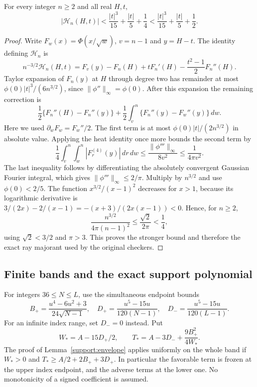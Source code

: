 \begin{lemma}
\label{ext:global-gaussian-ray}
For every integer $n\ge2$ and all real $H,t$,
\[
 |\mathcal H_n(H,t)|
 <\frac{|t|^3}{15}+\frac{|t|}{5}+\frac14
 <\frac{|t|^3}{15}+\frac{|t|}{5}+\frac12.
\]
\end{lemma}
\begin{proof}
Write $F_w(x)=\Phi(x/\sqrt w)$, $v=n-1$ and $y=H-t$.
The identity defining $\mathcal H_n$ is
\[
 n^{-3/2}\mathcal H_n(H,t)
 =F_v(y)-F_n(H)+tF_n'(H)-\frac{t^2-1}{2}F_n''(H).
\]
Taylor expansion of $F_n(y)$ at $H$ through degree two has remainder
at most $\phi(0)|t|^3/(6n^{3/2})$, since
$\|\phi''\|_\infty=\phi(0)$.
After this expansion the remaining correction is
\[
 \frac12\{F_n''(H)-F_n''(y)\}
 +\frac12\int_v^n\{F_n''(y)-F_w''(y)\}\,dw.
\]
Here we used $\partial_wF_w=F_w''/2$. The first term is at most
$\phi(0)|t|/(2n^{3/2})$ in absolute value. Applying the heat identity
once more bounds the second term by
\[
 \frac14\int_v^n\int_w^n
       |F_r^{(4)}(y)|\,dr\,dw
 \le\frac{\|\phi'''\|_\infty}{8v^2}
 \le\frac1{4\pi v^2}.
\]
The last inequality follows by differentiating the absolutely
convergent Gaussian Fourier integral, which gives
$\|\phi'''\|_\infty\le2/\pi$. Multiply by $n^{3/2}$ and use
$\phi(0)<2/5$. The function $x^{3/2}/(x-1)^2$ decreases for $x>1$,
because its logarithmic derivative is
$3/(2x)-2/(x-1)=-(x+3)/(2x(x-1))<0$. Hence, for $n\ge2$,
\[
 \frac{n^{3/2}}{4\pi(n-1)^2}
 \le\frac{\sqrt2}{2\pi}<\frac14,
\]
using $\sqrt2<3/2$ and $\pi>3$. This proves the stronger bound and
therefore the exact ray majorant used by the original checkers.
\end{proof}

\subsection{Finite bands and the exact support polynomial}\label{support:polynomial}
For integers $36\le N\le L$, use the simultaneous endpoint bounds
\[
 B_+=\frac{u^4-6u^2+3}{24\sqrt{N-1}},\quad
 D_+=\frac{u^5-15u}{120(N-1)},\quad
 D_-=\frac{u^5-15u}{120(L-1)}.
\]
For an infinite index range, set $D_-=0$ instead. Put
\[
 W_*=A-15D_+/2,\qquad
 T_*=A-3D_-+\frac{9B_+^2}{4W_*}.
\]
The proof of Lemma~\ref{support:envelope} applies uniformly on the whole band
if $W_*>0$ and $T_*\ge A/2+2B_++3D_+$. In particular the favorable
term is frozen at the upper index endpoint, and the adverse terms at
the lower one. No monotonicity of a signed coefficient is assumed.


